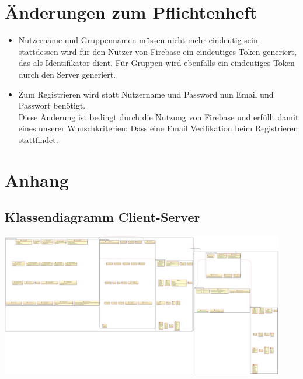 \documentclass[a4paper]{scrreprt}
\begin{document}
\chapter{Änderungen zum Pflichtenheft}
\begin{itemize}
	\item Nutzername und Gruppennamen müssen nicht mehr eindeutig sein \\
	stattdessen wird für den Nutzer von Firebase ein eindeutiges Token generiert, das als Identifikator dient. Für Gruppen wird ebenfalls ein eindeutiges \Gls{Token} durch den Server generiert.
	\item Zum Registrieren wird statt Nutzername und Password nun Email und Passwort benötigt. \\Diese Änderung ist bedingt durch die Nutzung von Firebase und erfüllt damit eines unserer Wunschkriterien: Dass eine Email Verifikation beim Registrieren stattfindet. 
\end{itemize}

\printglossaries

\chapter{Anhang}
\section{Klassendiagramm Client-Server}
\begin{center}
	\includegraphics[width=0.93\textwidth]{Klassendiagramme/client_server.png}
\end{center}
\end{document}

